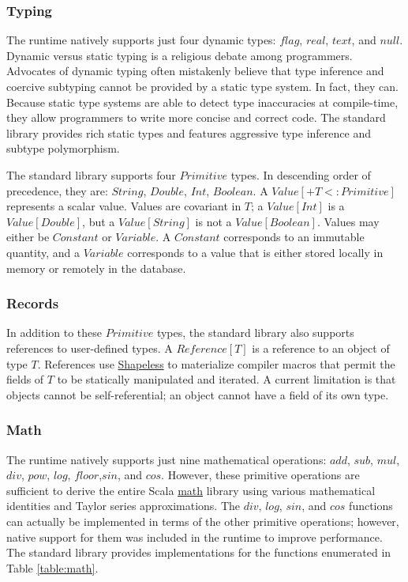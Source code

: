 \documentclass[../main.tex]{subfiles}
\begin{document}
    \subsubsection{Typing}
    The runtime natively supports just four dynamic types: $flag$, $real$, $text$, and $null$.
    Dynamic versus static typing is a religious debate among programmers. Advocates of dynamic
    typing often mistakenly believe that type inference and coercive subtyping cannot be provided by
    a static type system. In fact, they can. Because static type systems are able to
    detect type inaccuracies at compile-time, they allow programmers to write more concise and
    correct code. \cite{typing} The standard library provides rich static types and features
    aggressive type inference and subtype polymorphism.

    The standard library supports four $Primitive$ types. In descending order of precedence, they
    are: $String$, $Double$, $Int$, $Boolean$. A $Value[+T <: Primitive]$ represents a scalar value.
    Values are covariant in $T$; a $Value[Int]$ is a $Value[Double]$, but a $Value[String]$ is
    not a $Value[Boolean]$. Values may either be $Constant$ or $Variable$. A $Constant$ corresponds
    to an immutable quantity, and a $Variable$ corresponds to a value that is either stored locally
    in memory or remotely in the database.

    \subsubsection{Records}
    In addition to these $Primitive$ types, the standard library also supports references to
    user-defined types. A $Reference[T]$ is a reference to an object of type $T$. References use
    \href{https://github.com/milessabin/shapeless}{Shapeless} to materialize compiler macros that
    permit the fields of $T$ to be statically manipulated and iterated. A current limitation is that
    objects cannot be self-referential; an object cannot have a field of its own type.

    \subsubsection{Math}
    The runtime natively supports just nine mathematical operations: $add$, $sub$, $mul$, $div$, $pow$,
    $log$, $floor$,$sin$, and $cos$. However, these primitive operations are sufficient to derive the
    entire Scala \href{https://www.scala-lang.org/api/2.12.1/scala/math/index.html}{math} library using
    various mathematical identities and Taylor series approximations. The $div$, $log$, $sin$, and $cos$
    functions can actually be implemented in terms of the other primitive operations; however, native
    support for them was included in the runtime to improve performance. The standard library provides
    implementations for the functions enumerated in Table \ref{table:math}.
\end{document}
